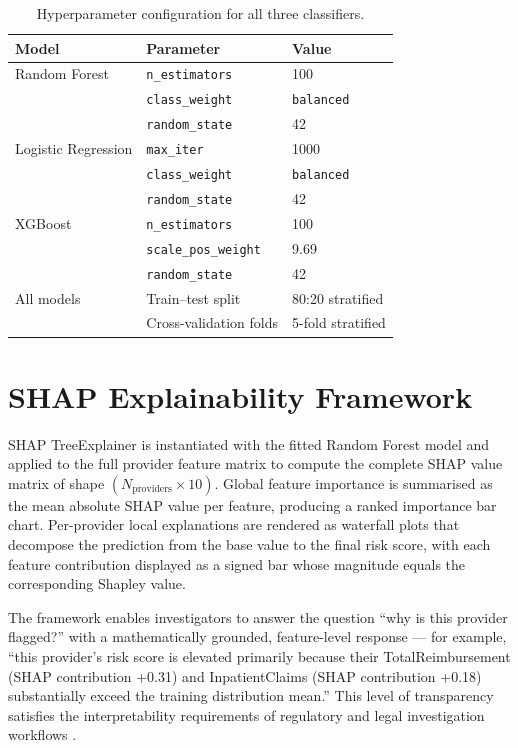 \begin{table}[htbp]
\centering
\caption{Hyperparameter configuration for all three classifiers.}
\label{tab:hyperparams}
\begin{tabular}{@{}lll@{}}
\toprule
\textbf{Model} & \textbf{Parameter} & \textbf{Value} \\
\midrule
Random Forest        & \texttt{n\_estimators}    & 100 \\
                     & \texttt{class\_weight}    & \texttt{balanced} \\
                     & \texttt{random\_state}    & 42 \\
\midrule
Logistic Regression  & \texttt{max\_iter}        & 1000 \\
                     & \texttt{class\_weight}    & \texttt{balanced} \\
                     & \texttt{random\_state}    & 42 \\
\midrule
XGBoost              & \texttt{n\_estimators}    & 100 \\
                     & \texttt{scale\_pos\_weight} & 9.69 \\
                     & \texttt{random\_state}    & 42 \\
\midrule
All models           & Train--test split         & 80:20 stratified \\
                     & Cross-validation folds    & 5-fold stratified \\
\bottomrule
\end{tabular}
\end{table}

\section{SHAP Explainability Framework}
\label{sec:shap}

SHAP TreeExplainer is instantiated with the fitted Random Forest model and applied to the full provider feature matrix to compute the complete SHAP value matrix of shape $(N_{\text{providers}} \times 10)$. Global feature importance is summarised as the mean absolute SHAP value per feature, producing a ranked importance bar chart. Per-provider local explanations are rendered as waterfall plots that decompose the prediction from the base value to the final risk score, with each feature contribution displayed as a signed bar whose magnitude equals the corresponding Shapley value.

The framework enables investigators to answer the question ``why is this provider flagged?'' with a mathematically grounded, feature-level response --- for example, ``this provider's risk score is elevated primarily because their TotalReimbursement (SHAP contribution +0.31) and InpatientClaims (SHAP contribution +0.18) substantially exceed the training distribution mean.'' This level of transparency satisfies the interpretability requirements of regulatory and legal investigation workflows \cite{b7}\cite{b8}.

